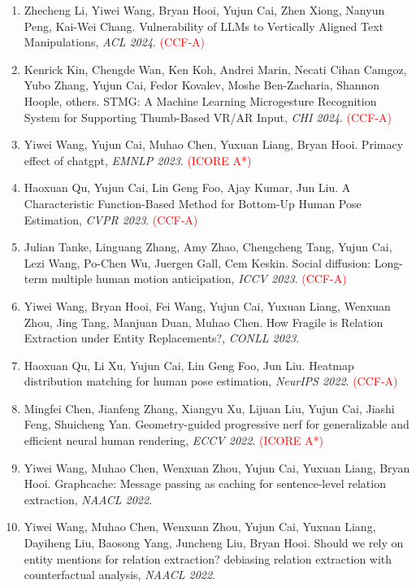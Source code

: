 \begin{enumerate}
\item Zhecheng Li, Yiwei Wang, Bryan Hooi, Yujun Cai, Zhen Xiong, Nanyun Peng, Kai-Wei Chang. Vulnerability of LLMs to Vertically Aligned Text Manipulations, \textit{ACL 2024}. \textcolor{red}{(CCF-A)}

\item Kenrick Kin, Chengde Wan, Ken Koh, Andrei Marin, Necati Cihan Camgoz, Yubo Zhang, Yujun Cai, Fedor Kovalev, Moshe Ben-Zacharia, Shannon Hoople, others. STMG: A Machine Learning Microgesture Recognition System for Supporting Thumb-Based VR/AR Input, \textit{CHI 2024}. \textcolor{red}{(CCF-A)}

\item Yiwei Wang, Yujun Cai, Muhao Chen, Yuxuan Liang, Bryan Hooi. Primacy effect of chatgpt, \textit{EMNLP 2023}. \textcolor{red}{(ICORE A*)}

\item Haoxuan Qu, Yujun Cai, Lin Geng Foo, Ajay Kumar, Jun Liu. A Characteristic Function-Based Method for Bottom-Up Human Pose Estimation, \textit{CVPR 2023}. \textcolor{red}{(CCF-A)}

\item Julian Tanke, Linguang Zhang, Amy Zhao, Chengcheng Tang, Yujun Cai, Lezi Wang, Po-Chen Wu, Juergen Gall, Cem Keskin. Social diffusion: Long-term multiple human motion anticipation, \textit{ICCV 2023}. \textcolor{red}{(CCF-A)}

\item Yiwei Wang, Bryan Hooi, Fei Wang, Yujun Cai, Yuxuan Liang, Wenxuan Zhou, Jing Tang, Manjuan Duan, Muhao Chen. How Fragile is Relation Extraction under Entity Replacements?, \textit{CONLL 2023}.

\item Haoxuan Qu, Li Xu, Yujun Cai, Lin Geng Foo, Jun Liu. Heatmap distribution matching for human pose estimation, \textit{NeurIPS 2022}. \textcolor{red}{(CCF-A)}

\item Mingfei Chen, Jianfeng Zhang, Xiangyu Xu, Lijuan Liu, Yujun Cai, Jiashi Feng, Shuicheng Yan. Geometry-guided progressive nerf for generalizable and efficient neural human rendering, \textit{ECCV 2022}. \textcolor{red}{(ICORE A*)}

\item Yiwei Wang, Muhao Chen, Wenxuan Zhou, Yujun Cai, Yuxuan Liang, Bryan Hooi. Graphcache: Message passing as caching for sentence-level relation extraction, \textit{NAACL 2022}.

\item Yiwei Wang, Muhao Chen, Wenxuan Zhou, Yujun Cai, Yuxuan Liang, Dayiheng Liu, Baosong Yang, Juncheng Liu, Bryan Hooi. Should we rely on entity mentions for relation extraction? debiasing relation extraction with counterfactual analysis, \textit{NAACL 2022}.


\end{enumerate}
